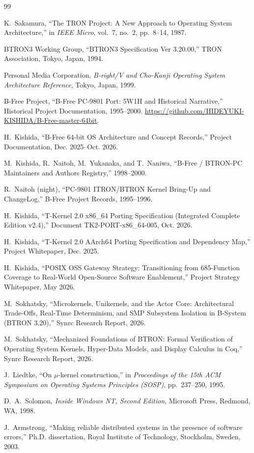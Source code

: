 \documentclass[10pt,journal,compsoc,twocolumn]{article}
\begin{document}
\begin{thebibliography}{99}

K.~Sakamura, ``The TRON Project: A New Approach to Operating System Architecture,'' in \emph{IEEE Micro}, vol.~7, no.~2, pp.~8--14, 1987.

BTRON3 Working Group, ``BTRON3 Specification Ver 3.20.00,'' TRON Association, Tokyo, Japan, 1994.

Personal Media Corporation, \emph{B-right/V and Cho-Kanji Operating System Architecture Reference}, Tokyo, Japan, 1999.

B-Free Project, ``B-Free PC-9801 Port: 5W1H and Historical Narrative,'' Historical Project Documentation, 1995--2000. \url{https://github.com/HIDEYUKI-KISHIDA/B-Free-master-64bit}.

H.~Kishida, ``B-Free 64-bit OS Architecture and Concept Records,'' Project Documentation, Dec. 2025--Oct. 2026.

M.~Kishida, R.~Naitoh, M.~Yukanaka, and T.~Naniwa, ``B-Free / BTRON-PC Maintainers and Authors Registry,'' 1998--2000.

R.~Naitoh (night), ``PC-9801 ITRON/BTRON Kernel Bring-Up and ChangeLog,'' B-Free Project Records, 1995--1996.

H.~Kishida, ``T-Kernel 2.0 x86\_64 Porting Specification (Integrated Complete Edition v2.4),'' Document TK2-PORT-x86\_64-005, Oct. 2026.

H.~Kishida, ``T-Kernel 2.0 AArch64 Porting Specification and Dependency Map,'' Project Whitepaper, Dec. 2025.

H.~Kishida, ``POSIX OSS Gateway Strategy: Transitioning from 685-Function Coverage to Real-World Open-Source Software Enablement,'' Project Strategy Whitepaper, May 2026.

M.~Sokhatsky, ``Microkernels, Unikernels, and the Actor Core: Architectural Trade-Offs, Real-Time Determinism, and SMP Subsystem Isolation in B-System (BTRON 3.20),'' Synrc Research Report, 2026.

M.~Sokhatsky, ``Mechanized Foundations of BTRON: Formal Verification of Operating System Kernels, Hyper-Data Models, and Display Calculus in Coq,'' Synrc Research Report, 2026.

J.~Liedtke, ``On $\mu$-kernel construction,'' in \emph{Proceedings of the 15th ACM Symposium on Operating Systems Principles (SOSP)}, pp.~237--250, 1995.

D.~A.~Solomon, \emph{Inside Windows NT, Second Edition}, Microsoft Press, Redmond, WA, 1998.

J.~Armstrong, ``Making reliable distributed systems in the presence of software errors,'' Ph.D. dissertation, Royal Institute of Technology, Stockholm, Sweden, 2003.

\end{thebibliography}
\end{document}
